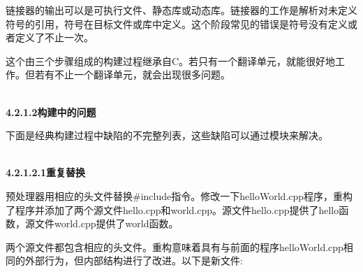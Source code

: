 链接器的输出可以是可执行文件、静态库或动态库。链接器的工作是解析对未定义符号的引用，符号在目标文件或库中定义。这个阶段常见的错误是符号没有定义或者定义了不止一次。

这个由三个步骤组成的构建过程继承自C。若只有一个翻译单元，就能很好地工作。但若有不止一个翻译单元，就会出现很多问题。

\hspace*{\fill} \\ %
\noindent
\textbf{4.2.1.2\hspace{0.2cm}构建中的问题}

下面是经典构建过程中缺陷的不完整列表，这些缺陷可以通过模块来解决。

\hspace*{\fill} \\ %
\noindent
\textbf{4.2.1.2.1\hspace{0.2cm}重复替换}

预处理器用相应的头文件替换\#include指令。修改一下helloWorld.cpp程序，重构了程序并添加了两个源文件hello.cpp和world.cpp。源文件hello.cpp提供了hello函数，源文件world.cpp提供了world函数。

两个源文件都包含相应的头文件。重构意味着具有与前面的程序helloWorld.cpp相同的外部行为，但内部结构进行了改进。以下是新文件:

